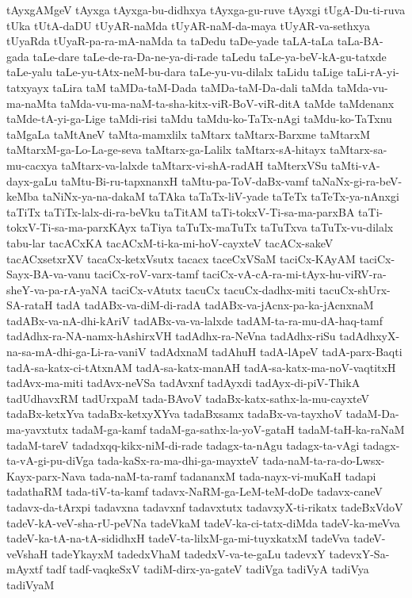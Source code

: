 {tAyxgAMgeV
tAyxga
tAyxga-bu-didhxya
tAyxga-gu-ruve
tAyxgi
tUgA-Du-ti-ruva
tUka
tUtA-daDU
tUyAR-naMda
tUyAR-naM-da-maya
tUyAR-va-sethxya
tUyaRda
tUyaR-pa-ra-mA-naMda
ta
taDedu
taDe-yade
taLA-taLa
taLa-BA-gada
taLe-dare
taLe-de-ra-Da-ne-ya-di-rade
taLedu
taLe-ya-beV-kA-gu-tatxde
taLe-yalu
taLe-yu-tAtx-neM-bu-dara
taLe-yu-vu-dilalx
taLidu
taLige
taLi-rA-yi-tatxyayx
taLira
taM
taMDa-taM-Dada
taMDa-taM-Da-dali
taMda
taMda-vu-ma-naMta
taMda-vu-ma-naM-ta-sha-kitx-viR-BoV-viR-ditA
taMde
taMdenanx
taMde-tA-yi-ga-Lige
taMdi-risi
taMdu
taMdu-ko-TaTx-nAgi
taMdu-ko-TaTxnu
taMgaLa
taMtAneV
taMta-mamxlilx
taMtarx
taMtarx-Barxme
taMtarxM
taMtarxM-ga-Lo-La-ge-seva
taMtarx-ga-Lalilx
taMtarx-sA-hitayx
taMtarx-sa-mu-cacxya
taMtarx-va-lalxde
taMtarx-vi-shA-radAH
taMterxVSu
taMti-vA-dayx-gaLu
taMtu-Bi-ru-tapxnanxH
taMtu-pa-ToV-daBx-vamf
taNaNx-gi-ra-beV-keMba
taNiNx-ya-na-dakaM
taTAka
taTaTx-liV-yade
taTeTx
taTeTx-ya-nAnxgi
taTiTx
taTiTx-lalx-di-ra-beVku
taTitAM
taTi-tokxV-Ti-sa-ma-parxBA
taTi-tokxV-Ti-sa-ma-parxKAyx
taTiya
taTuTx-maTuTx
taTuTxva
taTuTx-vu-dilalx
tabu-lar
tacACxKA
tacACxM-ti-ka-mi-hoV-cayxteV
tacACx-sakeV
tacACxsetxrXV
tacaCx-ketxVsutx
tacacx
taceCxVSaM
taciCx-KAyAM
taciCx-Sayx-BA-va-vanu
taciCx-roV-varx-tamf
taciCx-vA-cA-ra-mi-tAyx-hu-viRV-ra-sheY-va-pa-rA-yaNA
taciCx-vAtutx
tacuCx
tacuCx-dadhx-miti
tacuCx-shUrx-SA-rataH
tadA
tadABx-va-diM-di-radA
tadABx-va-jAcnx-pa-ka-jAcnxnaM
tadABx-va-nA-dhi-kAriV
tadABx-va-va-lalxde
tadAM-ta-ra-mu-dA-haq-tamf
tadAdhx-ra-NA-namx-hAshirxVH
tadAdhx-ra-NeVna
tadAdhx-riSu
tadAdhxyX-na-sa-mA-dhi-ga-Li-ra-vaniV
tadAdxnaM
tadAhuH
tadA-lApeV
tadA-parx-Baqti
tadA-sa-katx-ci-tAtxnAM
tadA-sa-katx-manAH
tadA-sa-katx-ma-noV-vaqtitxH
tadAvx-ma-miti
tadAvx-neVSa
tadAvxnf
tadAyxdi
tadAyx-di-piV-ThikA
tadUdhavxRM
tadUrxpaM
tada-BAvoV
tadaBx-katx-sathx-la-mu-cayxteV
tadaBx-ketxYva
tadaBx-ketxyXYva
tadaBxsamx
tadaBx-va-tayxhoV
tadaM-Da-ma-yavxtutx
tadaM-ga-kamf
tadaM-ga-sathx-la-yoV-gataH
tadaM-taH-ka-raNaM
tadaM-tareV
tadadxqq-kikx-niM-di-rade
tadagx-ta-nAgu
tadagx-ta-vAgi
tadagx-ta-vA-gi-pu-diVga
tada-kaSx-ra-ma-dhi-ga-mayxteV
tada-naM-ta-ra-do-Lwsx-Kayx-parx-Nava
tada-naM-ta-ramf
tadananxM
tada-nayx-vi-muKaH
tadapi
tadathaRM
tada-tiV-ta-kamf
tadavx-NaRM-ga-LeM-teM-doDe
tadavx-caneV
tadavx-da-tArxpi
tadavxna
tadavxnf
tadavxtutx
tadavxyX-ti-rikatx
tadeBxVdoV
tadeV-kA-veV-sha-rU-peVNa
tadeVkaM
tadeV-ka-ci-tatx-diMda
tadeV-ka-meVva
tadeV-ka-tA-na-tA-sididhxH
tadeV-ta-lilxM-ga-mi-tuyxkatxM
tadeVva
tadeV-veVshaH
tadeYkayxM
tadedxVhaM
tadedxV-va-te-gaLu
tadevxY
tadevxY-Sa-mAyxtf
tadf
tadf-vaqkeSxV
tadiM-dirx-ya-gateV
tadiVga
tadiVyA
tadiVya
tadiVyaM
}
